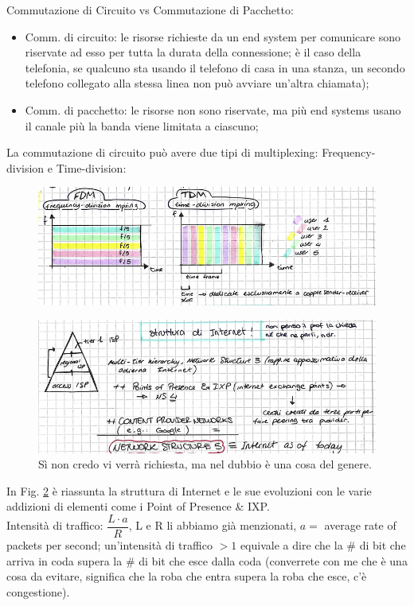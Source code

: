 \noindent {}Commutazione di Circuito vs Commutazione di Pacchetto:
\begin{itemize}
    \item Comm. di circuito: le risorse richieste da un end system per comunicare sono riservate ad esso per tutta la durata della connessione; è il caso della telefonia, se qualcuno sta usando il telefono di casa in una stanza, un secondo telefono collegato alla stessa linea non può avviare un'altra chiamata);
    \item Comm. di pacchetto: le risorse non sono riservate, ma più end systems usano il canale più la banda viene limitata a ciascuno;
\end{itemize}

\noindent La commutazione di circuito può avere due tipi di multiplexing: Frequency-division e Time-division:

\begin{figure} [h]
    \centering
    \includegraphics[width=0.6\linewidth]{Figures/01/circswitch.png}
    \label{fig:circswitch}
\end{figure}

\begin{figure}
    \centering
\includegraphics[width=0.8\linewidth]{Figures/01/isp-hierarchy.png}
    \caption{Sì non credo vi verrà richiesta, ma nel dubbio è una cosa del genere.}
    \label{fig:in-structure}
\end{figure}

\noindent In Fig. \ref{fig:in-structure} è riassunta la struttura di Internet e le sue evoluzioni con le varie addizioni di elementi come i Point of Presence \& IXP.\\

\noindent {}Intensità di traffico: $\dfrac{L\cdot a}{R}$, L e R li abbiamo già menzionati, $a=$ average rate of packets per second; un'intensità di traffico $>1$ equivale a dire che la $\#$ di bit che arriva in coda supera la $\#$ di bit che esce dalla coda (converrete con me che è una cosa da evitare, significa che la roba che entra supera la roba che esce, c'è congestione).\\


